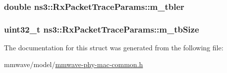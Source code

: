 \subsubsection[{\texorpdfstring{m\+\_\+tbler}{m_tbler}}]{\setlength{\rightskip}{0pt plus 5cm}double ns3\+::\+Rx\+Packet\+Trace\+Params\+::m\+\_\+tbler}\hypertarget{structns3_1_1RxPacketTraceParams_a0e8ecd8a819a9b89219daa727dae77f0}{}\label{structns3_1_1RxPacketTraceParams_a0e8ecd8a819a9b89219daa727dae77f0}
\subsubsection[{\texorpdfstring{m\+\_\+tb\+Size}{m_tbSize}}]{\setlength{\rightskip}{0pt plus 5cm}uint32\+\_\+t ns3\+::\+Rx\+Packet\+Trace\+Params\+::m\+\_\+tb\+Size}\hypertarget{structns3_1_1RxPacketTraceParams_ac5cd4fcbdfa8883531b0e316d097bbe0}{}\label{structns3_1_1RxPacketTraceParams_ac5cd4fcbdfa8883531b0e316d097bbe0}


The documentation for this struct was generated from the following file\+:\begin{DoxyCompactItemize}
\item 
mmwave/model/\hyperlink{mmwave-phy-mac-common_8h}{mmwave-\/phy-\/mac-\/common.\+h}\end{DoxyCompactItemize}
